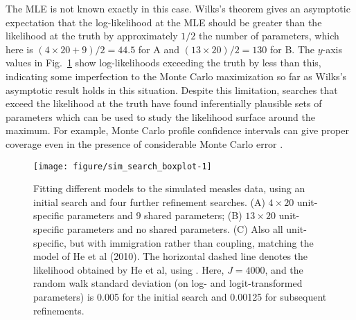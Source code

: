 \documentclass[12pt]{article}\usepackage[]{graphicx}\usepackage[]{xcolor}
\newenvironment{knitrout}{}{} %
\begin{document}
The MLE is not known exactly in this case.
Wilks's theorem gives an asymptotic expectation that the log-likelihood at the MLE should be greater than the likelihood at the truth by approximately $1/2$ the number of parameters, which here is $(4\times 20+9)/2=44.5$ for A and $(13\times 20)/2=130$ for B.
The $y$-axis values in Fig.~\ref{fig:sim_search_boxplot} show log-likelihoods exceeding the truth by less than this, indicating some imperfection to the Monte Carlo maximization so far as Wilks's asymptotic result holds in this situation. 
Despite this limitation, searches that exceed the likelihood at the truth have found inferentially plausible sets of parameters which can be used to study the likelihood surface around the maximum.
For example, Monte Carlo profile confidence intervals can give proper coverage even in the presence of considerable Monte Carlo error \citep{ionides17,ning21}.








\begin{knitrout}
\color{fgcolor}\begin{figure}

\texttt{[image: figure/sim\_search\_boxplot-1]} \hfill{}

\caption[Fitting different models to the simulated measles data, using an initial search and four further refinement searches]{Fitting different models to the simulated measles data, using an initial search and four further refinement searches. (A) $4\times 20$ unit-specific parameters and $9$ shared parameters; (B) $13\times 20$ unit-specific parameters and no shared parameters. (C) Also all unit-specific, but with immigration rather than coupling, matching the model of He et al (2010). The horizontal dashed line denotes the likelihood obtained by He et al, using . Here, $J=4000$, and the random walk standard deviation (on log- and logit-transformed parameters) is 0.005 for the initial search and 0.00125 for subsequent refinements.}\label{fig:sim_search_boxplot}
\end{figure}

\end{knitrout}
\end{document}

